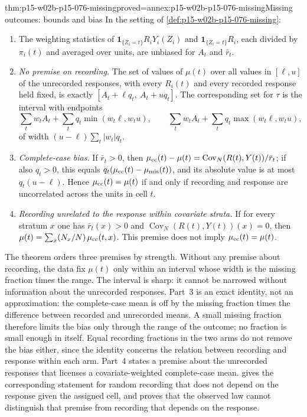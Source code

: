 \begin{hbtheorem}{thm:p15-w02b-p15-076-missing}{proved=annex:p15-w02b-p15-076-missing}{Missing outcomes: bounds and bias}
In the setting of \cref{def:p15-w02b-p15-076-missing}:
\begin{enumerate}
\item The weighting statistics of \(\mathbf 1_{\{Z_i=t\}}R_iY_i(Z_i)\)
      and \(\mathbf 1_{\{Z_i=t\}}R_i\), each divided by \(\pi_i(t)\) and
      averaged over units, are unbiased for \(A_t\) and \(\bar r_t\).
\item \emph{No premise on recording.} The set of values of \(\mu(t)\) over
      all values in \([\ell,u]\) of the unrecorded responses, with every
      \(R_i(t)\) and every recorded response held fixed, is exactly
      \([A_t+\ell q_t,\ A_t+uq_t]\). The corresponding set for \(\tau\) is
      the interval with endpoints
      \[
       \sum_tw_tA_t+\sum_tq_t\min(w_t\ell,w_tu),\qquad
       \sum_tw_tA_t+\sum_tq_t\max(w_t\ell,w_tu),
      \]
      of width \((u-\ell)\sum_t|w_t|q_t\).
\item \emph{Complete-case bias.} If \(\bar r_t>0\), then
      \(\mu_{\rm cc}(t)-\mu(t)=\operatorname{Cov}_N(R(t),Y(t))/\bar r_t\);
      if also \(q_t>0\), this equals
      \(q_t(\mu_{\rm cc}(t)-\mu_{\rm mis}(t))\), and its absolute value is
      at most \(q_t(u-\ell)\). Hence \(\mu_{\rm cc}(t)=\mu(t)\) if and only
      if recording and response are uncorrelated across the units in cell
      \(t\).
\item \emph{Recording unrelated to the response within covariate strata.}
      If for every stratum \(x\) one has \(\bar r_t(x)>0\) and
      \(\operatorname{Cov}_N(R(t),Y(t))(x)=0\), then
      \(\mu(t)=\sum_x(N_x/N)\,\mu_{\rm cc}(t,x)\). This premise does not
      imply \(\mu_{\rm cc}(t)=\mu(t)\).
\end{enumerate}
\end{hbtheorem}

The theorem orders three premises by strength. Without any premise
about recording, the data fix \(\mu(t)\) only within an interval whose
width is the missing fraction times the range. The interval is sharp: it
cannot be narrowed without information about the unrecorded responses.
Part~3 is an exact identity, not an approximation: the complete-case mean
is off by the missing fraction times the difference between recorded and
unrecorded means. A small missing fraction therefore limits the bias only
through the range of the outcome; no fraction is small enough in itself.
Equal recording fractions in the two arms do not remove the bias either,
since the identity concerns the relation between recording and response
within each arm. Part~4 states a premise about the unrecorded responses
that licenses a covariate-weighted complete-case mean.
 gives the corresponding statement
for random recording that does not depend on the response given the
assigned cell, and proves that the observed law cannot distinguish that
premise from recording that depends on the response.

